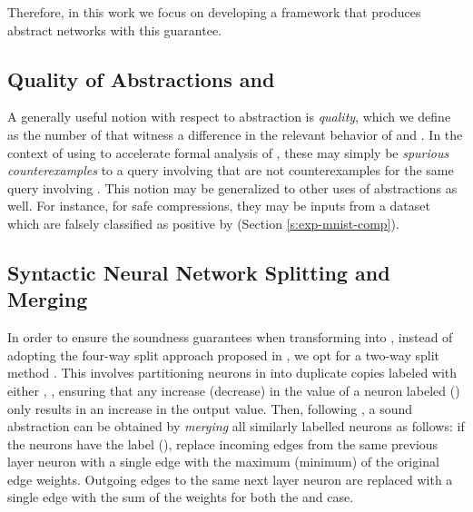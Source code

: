 Therefore, in this work we focus on developing a framework that produces
abstract networks with this guarantee.

\subsection{Quality of Abstractions and \gencex}
\label{s:qual}

A generally useful notion with respect to abstraction is \textit{quality},
which we define as the number of \textit{\gencex} that witness a difference in
the relevant behavior of \abs and \cnc. In the context of using \abs to
accelerate formal analysis of \dnn, these \gencex may simply be
\textit{spurious counterexamples} \cite{cegar-nn, cleverest-nn} to a query
involving \abs that are not counterexamples for the same query involving \cnc.
This notion may be generalized to other uses of abstractions as well. For
instance, for safe compressions, they may be inputs from a dataset which
are falsely classified as positive by \abs (Section \ref{s:exp-mnist-comp}).

\subsection{Syntactic Neural Network Splitting and Merging}
\label{s:nn-sam}

In order to ensure the soundness guarantees when transforming \cnc into \abs, 
instead of adopting the four-way split approach proposed in \cite{cegar-nn},
we opt for a two-way split method \cite{chauhan2022efficiently,liu2022abstraction,
10.1145/3644387}. This involves partitioning neurons in \cnc into duplicate
copies labeled with either {\inc, \dec}, ensuring that any increase 
(decrease) in the value of a neuron labeled \inc (\dec) only results in 
an increase in the output value. Then, following \cite{cegar-nn}, a sound 
abstraction can be obtained by \textit{merging} all similarly 
labelled neurons as follows: if the neurons have
the label \inc (\dec), replace incoming edges from the same
previous layer neuron with a single edge with the maximum (minimum) of the
original edge weights. Outgoing edges to the same next layer neuron are replaced
with a single edge with the sum of the weights for both the \inc and \dec case.


